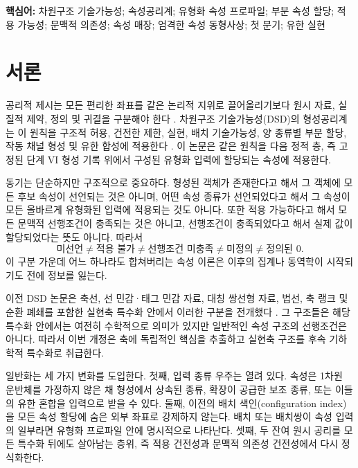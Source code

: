 \documentclass[11pt]{article}
\theoremstyle{definition}
\theoremstyle{remark}
\begin{document}
\noindent\textbf{핵심어:} 차원구조 기술가능성; 속성공리계; 유형화 속성 프로파일; 부분 속성 할당; 적용 가능성; 문맥적 의존성; 속성 매장; 엄격한 속성 동형사상; 첫 분기; 유한 실현

\clearpage
\hypersetup{linkcolor=black}
\tableofcontents
\hypersetup{linkcolor=blue}
\clearpage

\section{서론}
\label{sec:introduction}

공리적 제시는 모든 편리한 좌표를 같은 논리적 지위로 끌어올리기보다 원시 자료, 실질적 제약, 정의 및 귀결을 구분해야 한다 \cite{TarskiLogic}.
차원구조 기술가능성(DSD)의 형성공리계는 이 원칙을 구조적 허용, 건전한 제한, 실현, 배치 기술가능성, 양 종류별 부분 할당, 작동 채널 형성 및 유한 합성에 적용한다 \cite{KwonFormation}.
이 논문은 같은 원칙을 다음 정적 층, 즉 고정된 단계 VI 형성 기록 위에서 구성된 유형화 입력에 할당되는 속성에 적용한다.

동기는 단순하지만 구조적으로 중요하다.
형성된 객체가 존재한다고 해서 그 객체에 모든 후보 속성이 선언되는 것은 아니며, 어떤 속성 종류가 선언되었다고 해서 그 속성이 모든 올바르게 유형화된 입력에 적용되는 것도 아니다. 또한 적용 가능하다고 해서 모든 문맥적 선행조건이 충족되는 것은 아니고, 선행조건이 충족되었다고 해서 실제 값이 할당되었다는 뜻도 아니다.
따라서
\[
\text{미선언}\neq\text{적용 불가}\neq\text{선행조건 미충족}\neq\text{미정의}\neq\text{정의된 0}.
\]
이 구분 가운데 어느 하나라도 합쳐버리는 속성 이론은 이후의 집계나 동역학이 시작되기도 전에 정보를 잃는다.

이전 DSD 논문은 축선, 선 민감·태그 민감 자료, 대칭 쌍선형 자료, 법선, 축 랭크 및 순환 폐쇄를 포함한 실현축 특수화 안에서 이러한 구분을 전개했다 \cite{KwonAxisProperty}.
그 구조들은 해당 특수화 안에서는 여전히 수학적으로 의미가 있지만 일반적인 속성 구조의 선행조건은 아니다.
따라서 이번 개정은 축에 독립적인 핵심을 추출하고 실현축 구조를 후속 기하학적 특수화로 취급한다.

일반화는 세 가지 변화를 도입한다.
첫째, 입력 종류 우주는 열려 있다. 속성은 1차원 운반체를 가정하지 않은 채 형성에서 상속된 종류, 확장이 공급한 보조 종류, 또는 이들의 유한 혼합을 입력으로 받을 수 있다.
둘째, 이전의 배치 색인(configuration index)을 모든 속성 할당에 숨은 외부 좌표로 강제하지 않는다. 배치 또는 배치쌍이 속성 입력의 일부라면 유형화 프로파일 안에 명시적으로 나타난다.
셋째, 두 잔여 원시 공리를 모든 특수화 뒤에도 살아남는 층위, 즉 적용 건전성과 문맥적 의존성 건전성에서 다시 정식화한다.
\end{document}
